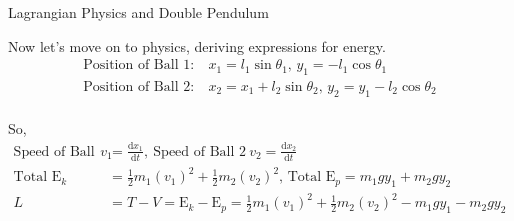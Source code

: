 \documentclass[aspectratio=169, 12pt]{beamer}
\newcommand{\dd}{\mathrm{d}}
\begin{document}
\begin{frame}{Lagrangian Physics and Double Pendulum}

	\small Now let's move on to physics, deriving expressions for energy.
	\begin{align*}
		\text{Position of Ball 1:}\  & x_1 = l_1 \sin{\theta_1},\, y_1 = -l_1 \cos{\theta_1}           \\
		\text{Position of Ball 2:}\  & x_2 = x_1 + l_2 \sin{\theta_2},\, y_2 = y_1 -l_2 \cos{\theta_2}
	\end{align*}
	\\\small So,
	\begin{align*}
		\text{Speed of Ball 1}\ v_1 & = \frac{\dd x_1}{\dd t},\ \text{Speed of Ball 2}\ v_2 = \frac{\dd x_2}{\dd t}           \\
		\text{Total } \text{E}_k    & = \frac{1}{2} m_1 (v_1)^2+\frac{1}{2} m_2 (v_2)^2,\, \text{Total E}_p = m_1gy_1+m_2gy_2 \\
		L                           & =T-V=\text{E}_k-\text{E}_p=\frac{1}{2}m_1(v_1)^2+\frac{1}{2}m_2(v_2)^2-m_1gy_1-m_2gy_2
	\end{align*}

\end{frame}
\end{document}
